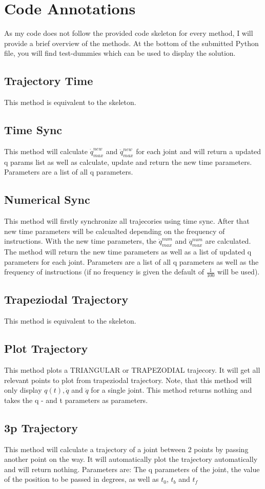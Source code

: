 \documentclass{article}
\begin{document}
	\section{Code Annotations}
	As my code does not follow the provided code skeleton for every method, I will provide a brief overview of the methods. At the bottom of the submitted Python file, you will find test-dummies which can be used to display the solution.
	\subsection{Trajectory Time}
	This method is equivalent to the skeleton.
	\subsection{Time Sync}
	This method will calculate $\dot{q}_{max}^{new}$ and $\ddot{q}_{max}^{new}$ for each joint and will return a updated q params list as well as calculate, update and return the new time parameters. Parameters are a list of all q parameters.
	\subsection{Numerical Sync}
	This method will firstly synchronize all trajecories using time sync. After that new time parameters will be calcualted depending on the frequency of instructions. With the new time parameters, the $\dot{q}_{max}^{num}$ and $\ddot{q}_{max}^{num}$ are calculated. The method will return the new time parameters as well as a list of updated q parameters for each joint. Parameters are a list of all q parameters as well as the frequency of instructions (if no frequency is given the default of $\frac{1}{100}$ will be used).
	\subsection{Trapeziodal Trajectory}
	This method is equivalent to the skeleton.
	\subsection{Plot Trajectory}
	This method plots a TRIANGULAR or TRAPEZODIAL trajecory. It will get all relevant points to plot from trapeziodal trajectory. Note, that this method will only display $q(t),\dot{q}$ and $\ddot{q}$ for a single joint. This method returns nothing and takes the q - and t parameters as parameters.
	 \subsection{3p Trajectory}
	 This method will calculate a trajectory of a joint between 2 points by passing another point on the way. It will automatically plot the trajectory automatically and will return nothing. Parameters are: The q parameters of the joint, the value of the position to be passed in degrees, as well as $t_0$, $t_b$ and $t_f$
	  
	
\end{document}
